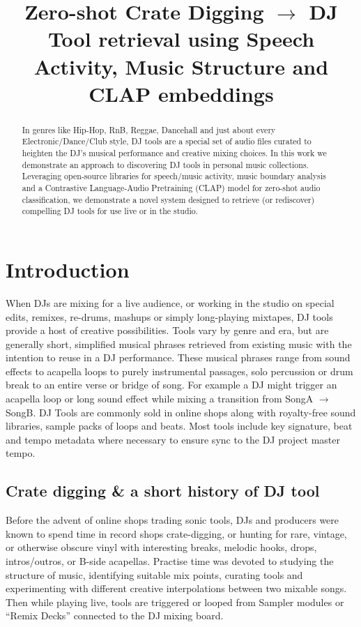 \documentclass{article}
\title{Zero-shot Crate Digging $\rightarrow$ DJ Tool retrieval using Speech Activity, Music Structure and CLAP embeddings}
\begin{document}
%
\maketitle
%
\begin{abstract}
In genres like Hip-Hop, RnB, Reggae, Dancehall and just about every Electronic/Dance/Club style, DJ tools are a special set of audio files curated to heighten the DJ's musical performance and creative mixing choices. In this work we demonstrate an approach to discovering DJ tools in personal music collections. Leveraging open-source libraries for speech/music activity, music boundary analysis and a Contrastive Language-Audio Pretraining (CLAP) model for zero-shot audio classification, we demonstrate a novel system designed to retrieve (or rediscover) compelling DJ tools for use live or in the studio.
 \end{abstract}

%
\section{Introduction}\label{sec:introduction}
When DJs are mixing for a live audience, or working in the studio on special edits,  remixes, re-drums, mashups or simply long-playing mixtapes, DJ tools provide a host of creative possibilities. Tools vary by genre and era, but are generally short, simplified musical phrases retrieved from existing music with the intention to reuse in a DJ performance. These musical phrases range from sound effects to acapella loops to purely instrumental passages, solo percussion or drum break to an entire verse or bridge of song. For example a DJ might trigger an acapella loop or long sound effect while mixing a transition from SongA $\rightarrow$ SongB. DJ Tools are commonly sold in online shops along with royalty-free sound libraries, sample packs of loops and beats. Most tools include key signature, beat and tempo metadata where necessary to ensure sync to the DJ project master tempo.

\subsection{Crate digging \& a short history of DJ tool}\label{sec:history}

Before the advent of online shops trading sonic tools, DJs and producers were known to spend time in record shops crate-digging, or hunting for rare, vintage, or otherwise obscure vinyl with interesting breaks, melodic hooks, drops, intros/outros, or B-side acapellas. Practise time was devoted to studying the structure of music, identifying suitable mix points, curating tools and experimenting with different creative interpolations between two mixable songs. Then while playing live, tools are triggered or looped from Sampler modules or ``Remix Decks'' connected to the DJ mixing board.
\end{document}

